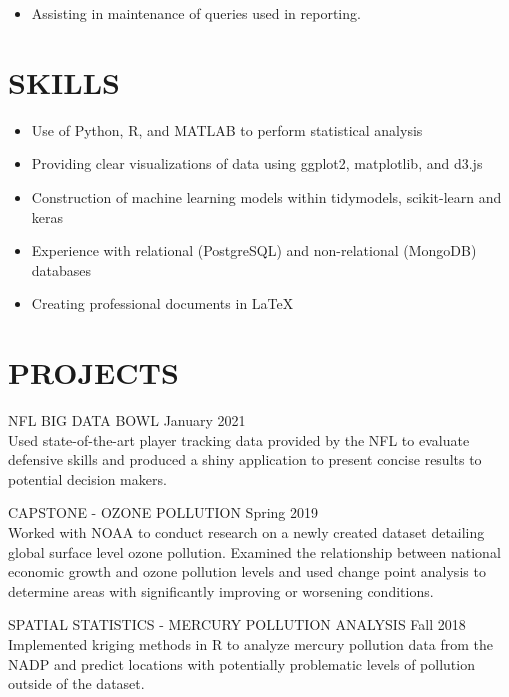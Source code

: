 \documentclass[11pt]{res} %
\begin{document}
\begin{resume}
\begin{itemize} 
	\item Assisting in maintenance of queries used in reporting.
\end{itemize}

\vspace{-0.2in}
\hrulefill
\vspace{-0.2in}  
\section{SKILLS}

\begin{itemize} 
	\item Use of Python, R, and MATLAB to perform statistical analysis
	\item Providing clear visualizations of data using ggplot2, matplotlib, and d3.js
	\item Construction of machine learning models within tidymodels, scikit-learn and keras
	\item Experience with relational (PostgreSQL) and non-relational (MongoDB) databases
	\item Creating professional documents in \LaTeX
\end{itemize}

\vspace{-0.2in}
\hrulefill
\vspace{-0.2in}  

\section{PROJECTS}
\begin{hangparas}{.25in}{1}
NFL BIG DATA BOWL \hfill January 2021 \\
Used state-of-the-art player tracking data provided by the NFL to evaluate defensive skills and produced a shiny application to present concise results to potential decision makers.
\vspace{-0.15in}  
	
CAPSTONE - OZONE POLLUTION \hfill Spring 2019	\\
Worked with NOAA to conduct research on a newly created dataset detailing global surface level ozone pollution. Examined the relationship between national economic growth and ozone pollution levels and used change point analysis to determine areas with significantly improving or worsening conditions.
\vspace{-0.15in}  

SPATIAL STATISTICS - MERCURY POLLUTION ANALYSIS \hfill Fall 2018 \\ \indent Implemented kriging methods in R to analyze mercury pollution data from the NADP and predict locations with potentially problematic levels of pollution outside of the dataset.
\vspace{-0.15in}  
\end{hangparas}
\end{resume}
\end{document}
